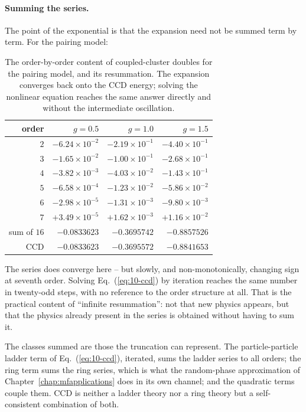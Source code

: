 \paragraph{Summing the series.}
The point of the exponential is that the expansion need not be summed term by
term.  For the pairing model:

\begin{table}[h]
\centering
\renewcommand{\arraystretch}{1.25}
\setlength{\tabcolsep}{9pt}
\small
\begin{tabular}{rrrr}
\toprule
order & $g=0.5$ & $g=1.0$ & $g=1.5$\\
\midrule
$2$ & $-6.24\times10^{-2}$ & $-2.19\times10^{-1}$ & $-4.40\times10^{-1}$\\
$3$ & $-1.65\times10^{-2}$ & $-1.00\times10^{-1}$ & $-2.68\times10^{-1}$\\
$4$ & $-3.82\times10^{-3}$ & $-4.03\times10^{-2}$ & $-1.43\times10^{-1}$\\
$5$ & $-6.58\times10^{-4}$ & $-1.23\times10^{-2}$ & $-5.86\times10^{-2}$\\
$6$ & $-2.98\times10^{-5}$ & $-1.31\times10^{-3}$ & $-9.80\times10^{-3}$\\
$7$ & $+3.49\times10^{-5}$ & $+1.62\times10^{-3}$ & $+1.16\times10^{-2}$\\
\midrule
sum of $16$ & $-0.0833623$ & $-0.3695742$ & $-0.8857526$\\
CCD & $-0.0833623$ & $-0.3695572$ & $-0.8841653$\\
\bottomrule
\end{tabular}
\caption{The order-by-order content of coupled-cluster doubles for the
pairing model, and its resummation.  The expansion converges back onto the
CCD energy; solving the nonlinear equation reaches the same answer directly
and without the intermediate oscillation.}
\label{tab:ccdorders}
\end{table}

The series does converge here -- but slowly, and non-monotonically, changing
sign at seventh order.  Solving Eq.~(\ref{eq:10-ccd}) by iteration reaches
the same number in twenty-odd steps, with no reference to the order
structure at all.  That is the practical content of ``infinite resummation'':
not that new physics appears, but that the physics already present in the
series is obtained without having to sum it.

The classes summed are those the truncation can represent.  The
particle-particle ladder term of Eq.~(\ref{eq:10-ccd}), iterated, sums the
ladder series to all orders; the ring term sums the ring series, which is
what the random-phase approximation of Chapter~\ref{chap:mfapplications} does
in its own channel; and the quadratic terms couple them.  CCD is neither a
ladder theory nor a ring theory but a self-consistent combination of both.

